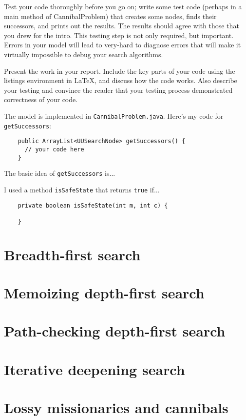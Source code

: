 \documentclass{article}
\begin{document}
Test your code thoroughly before you go on; write some test code (perhaps in a main method of CannibalProblem) that creates some nodes, finds their successors, and prints out the results. The results should agree with those that you drew for the intro. This testing step is not only required, but important. Errors in your model will lead to very-hard to diagnose errors that will make it virtually impossible to debug your search algorithms.

Present the work in your report. Include the key parts of your code using the listings environment in LaTeX, and discuss how the code works. Also describe your testing and convince the reader that your testing process demonstrated correctness of your code.



The model is implemented in 
\verb`CannibalProblem.java`.  Here's my code for \verb`getSuccessors`:


\begin{lstlisting}
    public ArrayList<UUSearchNode> getSuccessors() {
      // your code here
    }
\end{lstlisting}

The basic idea of \verb`getSuccessors` is...

I used a method \verb`isSafeState` that returns \verb`true` if...

\begin{lstlisting}
    private boolean isSafeState(int m, int c) {
  
    }

\end{lstlisting}

\section{Breadth-first search}

\section{Memoizing depth-first search}

\section{Path-checking depth-first search}

\section{Iterative deepening search}



\section{Lossy missionaries and cannibals}
\end{document}

